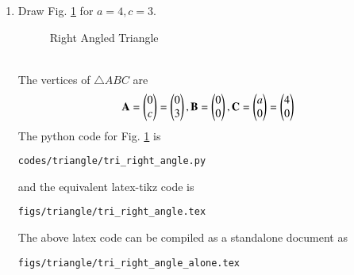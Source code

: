 \renewcommand{\theequation}{\theenumi}
\begin{enumerate}[label=\arabic*.,ref=\thesection.\theenumi]

%
\item Draw Fig. \ref{fig:tri_right_angle} for $a = 4, c =3$.
\label{const:tri_right_angle}
%
\begin{figure}[!ht]
\centering
\resizebox{\columnwidth}{!}{}
\caption{Right Angled Triangle}
\label{fig:tri_right_angle}	
\end{figure}
\\
\solution The vertices of $\triangle ABC$ are 
\begin{align}
\mathbf{A} = \begin{pmatrix}0\\c\end{pmatrix} = \begin{pmatrix}0\\3\end{pmatrix}, \mathbf{B} = \begin{pmatrix}0\\0\end{pmatrix}, \mathbf{C} = \begin{pmatrix}a\\0\end{pmatrix}=\begin{pmatrix}4\\0\end{pmatrix}
\end{align}
%
The python code for  Fig. \ref{fig:tri_right_angle} is
\begin{lstlisting}
codes/triangle/tri_right_angle.py
\end{lstlisting}
%
and the equivalent latex-tikz code is
%
\begin{lstlisting}
figs/triangle/tri_right_angle.tex
\end{lstlisting}
%
The above latex code can be compiled as a standalone document as
%
\begin{lstlisting}
figs/triangle/tri_right_angle_alone.tex
\end{lstlisting}
%


\end{enumerate}
